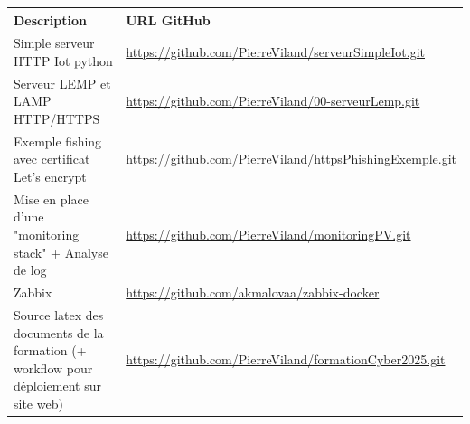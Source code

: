 \documentclass[french, 12pt]{article}%
\begin{document}
\footnotesize
\begin{tabular}{|>{\raggedright\arraybackslash}p{6cm}|>{\raggedright\arraybackslash}p{8cm}|}
\hline
\rowcolor{vert_capet} \textbf{Description} & \textbf{URL GitHub} \\
\hline
Simple serveur HTTP Iot python& \url{https://github.com/PierreViland/serveurSimpleIot.git} \\


\hline
Serveur LEMP et LAMP HTTP/HTTPS& \url{https://github.com/PierreViland/00-serveurLemp.git} \\
\hline
Exemple fishing avec certificat Let's encrypt& \url{https://github.com/PierreViland/httpsPhishingExemple.git} \\
\hline
Mise en place d'une "monitoring stack" + Analyse de log & \url{https://github.com/PierreViland/monitoringPV.git} \\
\hline
Zabbix & \url{https://github.com/akmalovaa/zabbix-docker} \\
\hline
Source latex des documents de la formation (+ workflow pour déploiement sur site web) & \url{https://github.com/PierreViland/formationCyber2025.git} \\
\hline
\end{tabular}

\normalsize
\end{document}
